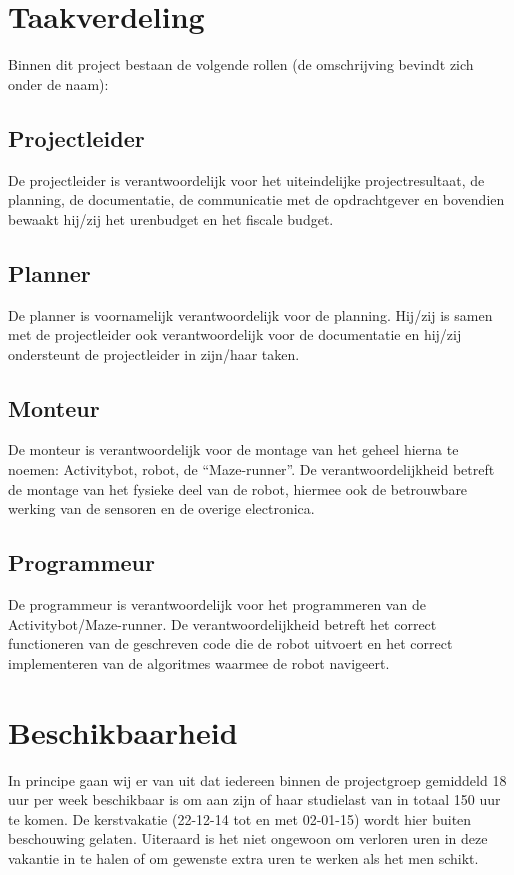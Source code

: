 \documentclass[oneside]{book}
\begin{document}
\section*{Taakverdeling}
Binnen dit project bestaan de volgende rollen (de omschrijving bevindt zich onder de naam):
\subsection*{Projectleider}
De projectleider is verantwoordelijk voor het uiteindelijke projectresultaat, de planning, de
documentatie, de communicatie met de opdrachtgever en bovendien bewaakt hij/zij het urenbudget
en het fiscale budget.
\subsection*{Planner}
De planner is voornamelijk verantwoordelijk voor de planning.
Hij/zij is samen met de projectleider ook verantwoordelijk voor de documentatie en hij/zij
ondersteunt de projectleider in zijn/haar taken.
\subsection*{Monteur}
De monteur is verantwoordelijk voor de montage van het geheel hierna te noemen: Activitybot,
robot, de “Maze-runner”.
De verantwoordelijkheid betreft de montage van het fysieke deel van de robot, hiermee ook de
betrouwbare werking van de sensoren en de overige electronica.
\subsection*{Programmeur}
De programmeur is verantwoordelijk voor het programmeren van de Activitybot/Maze-runner.
De verantwoordelijkheid betreft het correct functioneren van de geschreven code die de
robot uitvoert en het correct implementeren van de algoritmes waarmee de robot navigeert.

\section*{Beschikbaarheid}
In principe gaan wij er van uit dat iedereen binnen de projectgroep gemiddeld 18 uur per week
beschikbaar is om aan zijn of haar studielast van in totaal 150 uur te komen.
De kerstvakatie (22-12-14 tot en met 02-01-15) wordt hier buiten beschouwing gelaten. Uiteraard is het
niet ongewoon om verloren uren in deze vakantie in te halen of om gewenste extra uren te werken als het men schikt.
\end{document}
